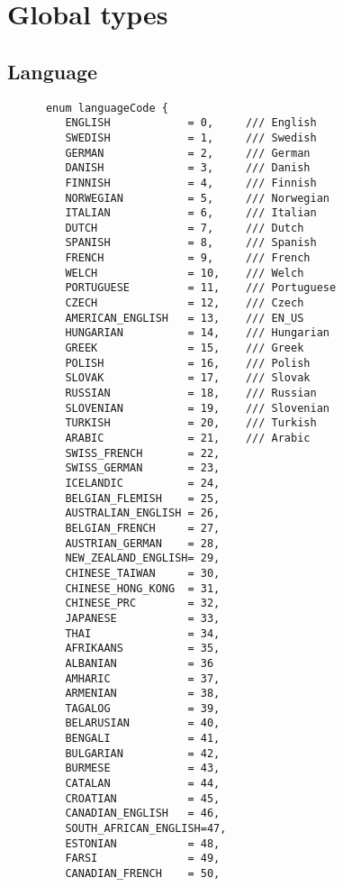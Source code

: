 \section{Global types}

\subsection{Language}

\label{languageCode}
\begin{verbatim}
      enum languageCode {
         ENGLISH            = 0,     /// English
         SWEDISH            = 1,     /// Swedish
         GERMAN             = 2,     /// German
         DANISH             = 3,     /// Danish
         FINNISH            = 4,     /// Finnish
         NORWEGIAN          = 5,     /// Norwegian
         ITALIAN            = 6,     /// Italian
         DUTCH              = 7,     /// Dutch 
         SPANISH            = 8,     /// Spanish
         FRENCH             = 9,     /// French 
         WELCH              = 10,    /// Welch 
         PORTUGUESE         = 11,    /// Portuguese
         CZECH              = 12,    /// Czech
         AMERICAN_ENGLISH   = 13,    /// EN_US 
         HUNGARIAN          = 14,    /// Hungarian
         GREEK              = 15,    /// Greek
         POLISH             = 16,    /// Polish
         SLOVAK             = 17,    /// Slovak
         RUSSIAN            = 18,    /// Russian
         SLOVENIAN          = 19,    /// Slovenian
         TURKISH            = 20,    /// Turkish
         ARABIC             = 21,    /// Arabic
         SWISS_FRENCH       = 22,
         SWISS_GERMAN       = 23,
         ICELANDIC          = 24,
         BELGIAN_FLEMISH    = 25,
         AUSTRALIAN_ENGLISH = 26,
         BELGIAN_FRENCH     = 27,
         AUSTRIAN_GERMAN    = 28,
         NEW_ZEALAND_ENGLISH= 29,
         CHINESE_TAIWAN     = 30,
         CHINESE_HONG_KONG  = 31,
         CHINESE_PRC        = 32,
         JAPANESE           = 33,
         THAI               = 34,
         AFRIKAANS          = 35,
         ALBANIAN           = 36
         AMHARIC            = 37,
         ARMENIAN           = 38,
         TAGALOG            = 39,
         BELARUSIAN         = 40,
         BENGALI            = 41,
         BULGARIAN          = 42,
         BURMESE            = 43,
         CATALAN            = 44,
         CROATIAN           = 45,
         CANADIAN_ENGLISH   = 46,
         SOUTH_AFRICAN_ENGLISH=47,
         ESTONIAN           = 48,
         FARSI              = 49,
         CANADIAN_FRENCH    = 50,

\end{verbatim}
